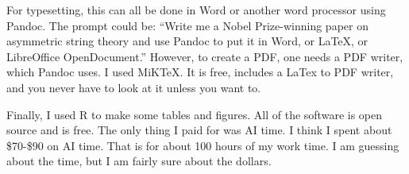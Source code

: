 \documentclass[11pt,letterpaper]{article}
\begin{document}
For typesetting, this can all be done in Word or another word processor using Pandoc. The prompt could be: ``Write me a Nobel Prize-winning paper on asymmetric string theory and use Pandoc to put it in Word, or LaTeX, or LibreOffice OpenDocument.'' However, to create a PDF, one needs a PDF writer, which Pandoc uses. I used MiKTeX. It is free, includes a LaTex to PDF writer, and you never have to look at it unless you want to. 

Finally, I used R to make some tables and figures. All of the software is open source and is free. The only thing I paid for was AI time. I think I spent about \$70-\$90 on AI time. That is for about 100 hours of my work time. I am guessing about the time, but I am fairly sure about the dollars.


\end{document}
